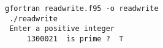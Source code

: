 \begin{Verbatim}[frame=lines,label=readwrite - commands and output]
 gfortran readwrite.f95 -o readwrite
 ./readwrite
 Enter a positive integer
     1300021  is prime ?  T
\end{Verbatim}
